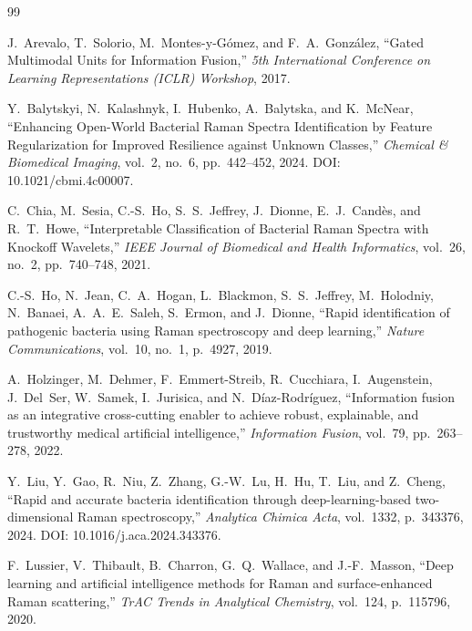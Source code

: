 \documentclass[preprint,12pt]{elsarticle}
\begin{document}
\begin{thebibliography}{99}

J.~Arevalo, T.~Solorio, M.~Montes-y-G{\'{o}}mez, and
F.~A.~Gonz{\'{a}}lez, ``Gated Multimodal Units for Information
Fusion,'' \textit{5th International Conference on Learning
Representations (ICLR) Workshop}, 2017.

Y.~Balytskyi, N.~Kalashnyk, I.~Hubenko, A.~Balytska, and K.~McNear,
``Enhancing Open-World Bacterial Raman Spectra Identification by
Feature Regularization for Improved Resilience against Unknown
Classes,'' \textit{Chemical \& Biomedical Imaging}, vol.~2, no.~6,
pp.~442--452, 2024. DOI: 10.1021/cbmi.4c00007.

C.~Chia, M.~Sesia, C.-S.~Ho, S.~S.~Jeffrey, J.~Dionne,
E.~J.~Cand{\`e}s, and R.~T.~Howe, ``Interpretable Classification of
Bacterial Raman Spectra with Knockoff Wavelets,'' \textit{IEEE Journal
of Biomedical and Health Informatics}, vol.~26, no.~2, pp.~740--748,
2021.


C.-S.~Ho, N.~Jean, C.~A.~Hogan, L.~Blackmon, S.~S.~Jeffrey,
M.~Holodniy, N.~Banaei, A.~A.~E.~Saleh, S.~Ermon, and J.~Dionne,
``Rapid identification of pathogenic bacteria using Raman spectroscopy
and deep learning,'' \textit{Nature Communications}, vol.~10, no.~1,
p.~4927, 2019.

A.~Holzinger, M.~Dehmer, F.~Emmert-Streib, R.~Cucchiara,
I.~Augenstein, J.~Del~Ser, W.~Samek, I.~Jurisica, and
N.~D{\'{i}}az-Rodr{\'{i}}guez, ``Information fusion as an integrative
cross-cutting enabler to achieve robust, explainable, and trustworthy
medical artificial intelligence,'' \textit{Information Fusion},
vol.~79, pp.~263--278, 2022.

Y.~Liu, Y.~Gao, R.~Niu, Z.~Zhang, G.-W.~Lu, H.~Hu, T.~Liu, and
Z.~Cheng, ``Rapid and accurate bacteria identification through
deep-learning-based two-dimensional Raman spectroscopy,''
\textit{Analytica Chimica Acta}, vol.~1332, p.~343376, 2024.
DOI: 10.1016/j.aca.2024.343376.

F.~Lussier, V.~Thibault, B.~Charron, G.~Q.~Wallace, and
J.-F.~Masson, ``Deep learning and artificial intelligence methods for
Raman and surface-enhanced Raman scattering,'' \textit{TrAC Trends in
Analytical Chemistry}, vol.~124, p.~115796, 2020.


\end{thebibliography}
\end{document}
